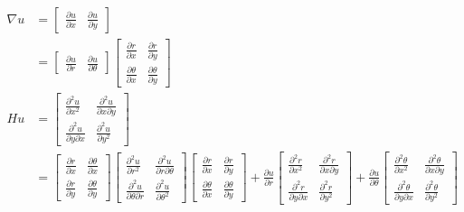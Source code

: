 \documentclass[11pt,letterpaper,draft]{report}
\newcommand\<{\langle}
\renewcommand\>{\rangle}
\begin{document}
\begin{align*}
  \nabla u
  &=
  \begin{bmatrix}
    \frac{\partial u}{\partial x} &
    \frac{\partial u}{\partial y}
  \end{bmatrix} \\
  &=
  \begin{bmatrix}
    \frac{\partial u}{\partial r} &
    \frac{\partial u}{\partial \theta}
  \end{bmatrix}
  \begin{bmatrix}
    \frac{\partial r}{\partial x} &
    \frac{\partial r}{\partial y} \\[1mm]
    \frac{\partial \theta}{\partial x} &
    \frac{\partial \theta}{\partial y}
  \end{bmatrix}
  \\
  Hu
  &=
  \begin{bmatrix}
    \frac{\partial ^{2}u}{\partial x^{2}} & 
    \frac{\partial ^{2}u}{\partial x\partial y} \\[1mm]
    \frac{\partial ^{2}u}{\partial y\partial x} & 
    \frac{\partial ^{2}u}{\partial y^{2}}
  \end{bmatrix} \\
  &=
  \begin{bmatrix}
    \frac{\partial r}{\partial x} &
    \frac{\partial \theta}{\partial x} \\[1mm]
    \frac{\partial r}{\partial y} &
    \frac{\partial \theta}{\partial y}
  \end{bmatrix}
  \begin{bmatrix}
    \frac{\partial ^{2}u}{\partial r^{2}} & 
    \frac{\partial ^{2}u}{\partial r\partial\theta} \\[1mm]
    \frac{\partial ^{2}u}{\partial \theta\partial r} & 
    \frac{\partial ^{2}u}{\partial \theta^{2}}
  \end{bmatrix}
  \begin{bmatrix}
    \frac{\partial r}{\partial x} &
    \frac{\partial r}{\partial y} \\[1mm]
    \frac{\partial \theta}{\partial x} &
    \frac{\partial \theta}{\partial y}
  \end{bmatrix}
  +
  \frac{\partial u}{\partial r}
  \begin{bmatrix}
    \frac{\partial ^{2}r}{\partial x^{2}} & 
    \frac{\partial ^{2}r}{\partial x\partial y} \\[1mm]
    \frac{\partial ^{2}r}{\partial y\partial x} & 
    \frac{\partial ^{2}r}{\partial y^{2}}
  \end{bmatrix}
  +
  \frac{\partial u}{\partial \theta}
  \begin{bmatrix}
    \frac{\partial ^{2}\theta}{\partial x^{2}} & 
    \frac{\partial ^{2}\theta}{\partial x\partial y} \\[1mm]
    \frac{\partial ^{2}\theta}{\partial y\partial x} & 
    \frac{\partial ^{2}\theta}{\partial y^{2}}
  \end{bmatrix}
\end{align*}
\end{document}
